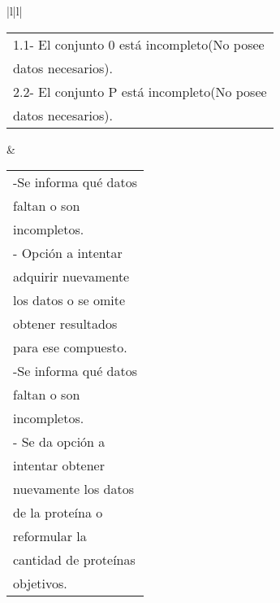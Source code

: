 \begin{longtable}{|l|l|}
\begin{tabular}[c]{@{}l@{}}1.1- El conjunto 0 está incompleto(No posee\\ datos necesarios).\\ 2.2- El conjunto P está incompleto(No posee\\ datos necesarios).\end{tabular}            & \begin{tabular}[c]{@{}l@{}}-Se informa qué datos \\ faltan o son \\ incompletos.\\ - Opción a intentar \\ adquirir  nuevamente  \\ los datos o se omite \\ obtener resultados \\ para ese compuesto.\\ -Se informa qué datos \\ faltan o son \\ incompletos.\\ - Se da opción a \\ intentar obtener\\ nuevamente los datos \\ de la proteína o \\ reformular  la \\ cantidad de proteínas \\ objetivos.\end{tabular} \\ \hline
{}                                                                                                                                                                                                                                                                                                                                                                                                                                                               \\ \hline
{}                                                                                                                                                                                                                                                                                                                                                                                                                                                                                                                 \\ \hline

\end{longtable}
